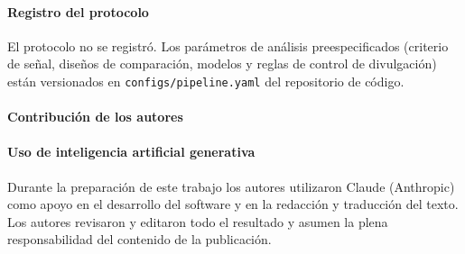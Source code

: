 \paragraph{Registro del protocolo} El protocolo no se registró. Los parámetros de análisis
preespecificados (criterio de señal, diseños de comparación, modelos y reglas de control de
divulgación) están versionados en \texttt{configs/pipeline.yaml} del repositorio de código.

\paragraph{Contribución de los autores} 

\paragraph{Uso de inteligencia artificial generativa} Durante la preparación de este trabajo los
autores utilizaron Claude (Anthropic) como apoyo en el desarrollo del software y en la redacción y
traducción del texto. Los autores revisaron y editaron todo el resultado y asumen la plena
responsabilidad del contenido de la publicación.
\normalsize
